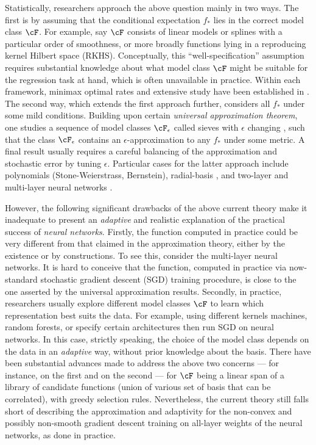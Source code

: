 \documentclass[11pt]{article}
\numberwithin{equation}{section}
\begin{document}
Statistically, researchers approach the above question mainly in two ways. The first is by assuming that the conditional expectation $f_*$ lies in the correct model class $\cF$. For example, say $\cF$ consists of linear models or splines with a particular order of smoothness, or more broadly functions lying in a reproducing kernel Hilbert space (RKHS). Conceptually, this ``well-specification'' assumption requires substantial knowledge about what model class $\cF$ might be suitable for the regression task at hand, which is often unavailable in practice. Within each framework, minimax optimal rates and extensive study have been established in \citep{stone1980optimal,wahba1990spline}.
The second way, which extends the first approach further, considers all $f_*$ under some mild conditions. Building upon certain \textit{universal approximation theorem}, one studies a sequence of model classes $\cF_{\epsilon}$ called sieves with $\epsilon$ changing \citep{geman1982nonparametric}, such that the class $\cF_{\epsilon}$ contains an $\epsilon$-approximation to any $f_*$ under some metric. A final result usually requires a careful balancing of the approximation and stochastic error by tuning $\epsilon$. Particular cases for the latter approach include polynomials (Stone-Weierstrass, Bernstein), radial-basis \citep{park1991universal, niyogi1996relationship}, and two-layer and multi-layer neural networks \citep{cybenko1989approximation,hornik1989multilayer, anthony2009neural, rahimi2008random, daniely2016toward, bach2017breaking, farrell2018deep, koehler2018representational, poggio2017and}.

However, the following significant drawbacks of the above current theory make it inadequate to present an \textit{adaptive} and realistic explanation of the practical success of \textit{neural networks}. 
Firstly, the function computed in practice could be very different from that claimed in the approximation theory, either by the existence or by constructions. To see this, consider the multi-layer neural networks. It is hard to conceive that the function, computed in practice via now-standard stochastic gradient descent (SGD) training procedure, is close to the one asserted by the universal approximation results. Secondly, in practice, researchers usually explore different model classes $\cF$ to learn which representation best suits the data. For example, using different kernels machines, random forests, or specify certain architectures then run SGD on neural networks. In this case, strictly speaking, the choice of the model class depends on the data in an \textit{adaptive} way, without prior knowledge about the basis. There have been substantial advances made to address the above two concerns --- for instance, \cite{jones1992simple} on the first and \cite{huang2008risk, barron2008approximation} on the second --- for $\cF$ being a linear span of a library of candidate functions (union of various set of basis that can be correlated), with greedy selection rules. Nevertheless, the current theory still falls short of describing the approximation and adaptivity for the non-convex and possibly non-smooth gradient descent training on all-layer weights of the neural networks, as done in practice.
\end{document}
